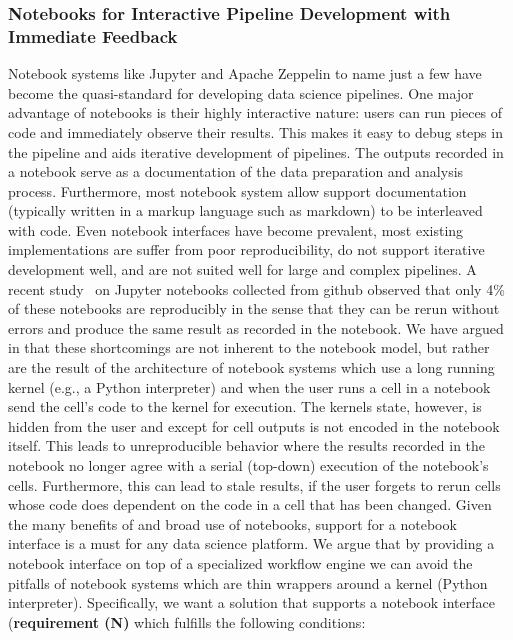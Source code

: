 \subsubsection{Notebooks for Interactive Pipeline Development with Immediate Feedback}
\label{sec:noteb-inter-pipel}
%
Notebook systems like Jupyter and Apache Zeppelin to name just a few have become the quasi-standard for developing data science pipelines. One major advantage of notebooks is their highly interactive nature: users can run pieces of code and immediately observe their results. This makes it easy to debug steps in the pipeline and aids iterative development of pipelines. The outputs recorded in a notebook serve as a documentation of the data preparation and analysis process. Furthermore, most notebook system allow support documentation (typically written in a markup language such as markdown) to be interleaved with code. Even notebook interfaces have become prevalent, most existing implementations are suffer from poor reproducibility, do not support iterative development well, and are not suited well for large and complex pipelines. A recent study~\cite{PM19} on Jupyter notebooks collected from github observed that only 4\% of these notebooks are reproducibly in the sense that they can be rerun without errors and produce the same result as recorded in the notebook. We have argued in \cite{BS20, DG22} that these shortcomings are not inherent to the notebook model, but rather are the result of the architecture of notebook systems which use a long running kernel (e.g., a Python interpreter) and when the user runs a cell in a notebook send the cell's code to the kernel for execution. The kernels state, however, is hidden from the user and except for cell outputs is not encoded in the notebook itself. This leads to unreproducible behavior where the results recorded in the notebook no longer agree with a serial (top-down) execution of the notebook's cells. Furthermore, this can lead to stale results, if the user forgets to rerun cells whose code does dependent on the code in a cell that has been changed. Given the many benefits of and broad use of notebooks, support for a notebook interface is a must for any data science platform. We argue that by providing a notebook interface on top of a specialized workflow engine we can avoid the pitfalls of notebook systems which are thin wrappers around a kernel (Python interpreter). Specifically, we want a solution that supports a notebook interface (\textbf{requirement (N)} which fulfills the following conditions:
